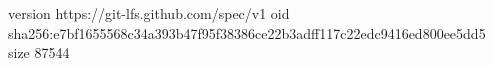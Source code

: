 version https://git-lfs.github.com/spec/v1
oid sha256:e7bf1655568c34a393b47f95f38386ce22b3adff117c22edc9416ed800ee5dd5
size 87544
